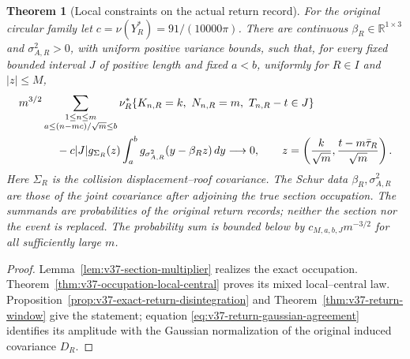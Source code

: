 \documentclass[11pt,reqno]{amsart}
\numberwithin{equation}{section}
\newtheorem{leadtheorem}{Theorem}
\theoremstyle{definition}\newtheorem{definition}[theorem]{Definition}
\theoremstyle{remark}\newtheorem{remark}[theorem]{Remark}
\newcommand{\R}{\mathbb R}\newcommand{\Z}{\mathbb Z}\newcommand{\T}{\mathbb T}
\begin{document}
\begin{leadtheorem}[Local constraints on the actual return record]
\label{thm:intro-v37-return-window}
For the original circular family let $c=\nu(Y_R^*)=91/(10000\pi)$.
There are continuous $\beta_R\in\R^{1\times3}$ and
$\sigma_{A,R}^2>0$, with uniform positive variance bounds, such that,
for every fixed bounded interval $J$ of positive length and fixed
$a<b$, uniformly for $R\in I$ and $|z|\le M$,
\begin{align}\label{eq:intro-v37-return-window}
 &m^{3/2}\sum_{\substack{1\le n\le m\\a\le(n-mc)/\sqrt m\le b}}
 \nu_R^*\{K_{n,R}=k,\ N_{n,R}=m,\ T_{n,R}-t\in J\}\notag\\
 &\hspace{12mm}
 -c|J|g_{\Sigma_R}(z)
       \int_a^b g_{\sigma_{A,R}^2}(y-\beta_Rz)\,dy
                           \longrightarrow0,\qquad
 z=\left(\frac{k}{\sqrt m},\frac{t-m\bar\tau_R}{\sqrt m}\right).
\end{align}
Here $\Sigma_R$ is the collision displacement--roof covariance.
The Schur data $\beta_R,\sigma_{A,R}^2$ are those of the joint
covariance after adjoining the true section occupation. The summands
are probabilities of the original return records; neither the section
nor the event is replaced. The probability sum is bounded below by
$c_{M,a,b,J}m^{-3/2}$ for all sufficiently large $m$.
\end{leadtheorem}
\begin{proof}
Lemma~\ref{lem:v37-section-multiplier} realizes the exact occupation.
Theorem~\ref{thm:v37-occupation-local-central} proves its mixed
local--central law. Proposition~\ref{prop:v37-exact-return-disintegration}
and Theorem~\ref{thm:v37-return-window} give the statement; equation
\eqref{eq:v37-return-gaussian-agreement} identifies its amplitude with
the Gaussian normalization of the original induced covariance $D_R$.
\end{proof}
\end{document}
